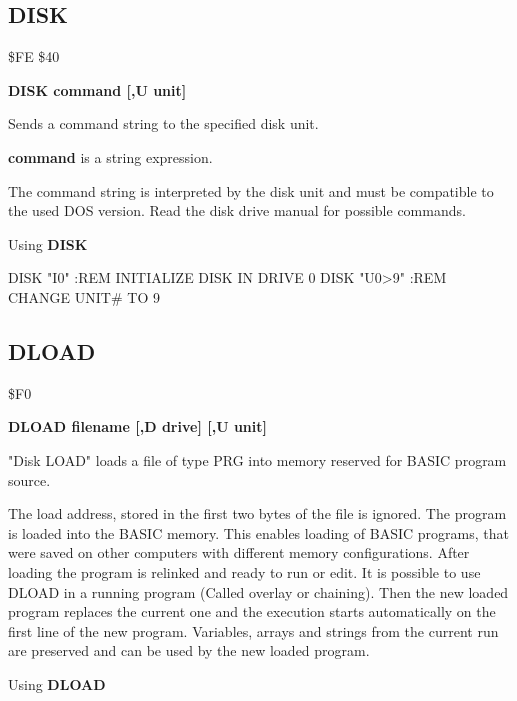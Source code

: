 \subsection{DISK}
\begin{description}[leftmargin=3cm,style=nextline]
\item [Token:] \$FE \$40
\item [Format:] {\bf DISK command [,U unit] }
\item [Usage:]
   Sends a command string to the
   specified disk unit.

   \unitdefinition

   {\bf command} is a string expression.

\item [Remarks:]
   The command string is interpreted by the disk unit
   and must be compatible to the used DOS version.
   Read the disk drive manual for possible commands.

\item [Example:] Using {\bf DISK}
\begin{screenoutput}
  DISK "I0"   :REM INITIALIZE DISK IN DRIVE 0
  DISK "U0>9" :REM CHANGE UNIT# TO 9
\end{screenoutput}
\end{description}


\newpage
\subsection{DLOAD}
\begin{description}[leftmargin=3cm,style=nextline]
\item [Token:] \$F0
\item [Format:] {\bf DLOAD filename [,D drive] [,U unit] }
\item [Usage:]
   "Disk LOAD" loads a file of type
   PRG into memory reserved for BASIC program source.

   \filenamedefinition

   \drivedefinition

   \unitdefinition

\item [Remarks:]
   The load address, stored in the first two bytes
   of the file is ignored. The program is loaded into
   the BASIC memory. This enables loading of BASIC programs,
   that were saved on other computers with different memory
   configurations. After loading the program is relinked
   and ready to run or edit.
   It is possible to use DLOAD in a running program
   (Called overlay or chaining).
   Then the new loaded program replaces the current one
   and the execution starts automatically on the first line of the
   new program. Variables, arrays and strings from the current
   run are preserved and can be used by the new loaded program.

\item [Example:] Using {\bf DLOAD}
\end{description}

